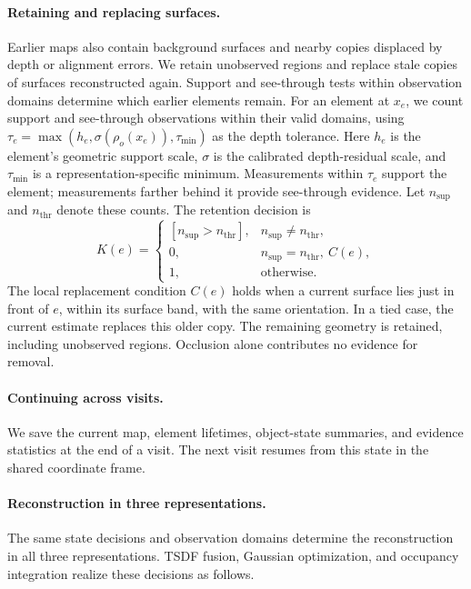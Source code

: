 \paragraph{Retaining and replacing surfaces.}
\label{sec:memory}
Earlier maps also contain background surfaces and nearby copies displaced by depth or alignment errors.
We retain unobserved regions and replace stale copies of surfaces reconstructed again.
Support and see-through tests within observation domains determine which earlier elements remain.
For an element at $x_e$, we count support and see-through observations within their valid domains, using
$\tau_e=\max(h_e,\sigma(\rho_o(x_e)),\tau_{\min})$ as the depth tolerance.
Here $h_e$ is the element's geometric support scale, $\sigma$ is the calibrated depth-residual scale, and
$\tau_{\min}$ is a representation-specific minimum.
Measurements within $\tau_e$ support the element; measurements farther behind it provide see-through evidence.
Let $n_{\mathrm{sup}}$ and $n_{\mathrm{thr}}$ denote these counts. The retention decision is
\begin{equation}
K(e)=\begin{cases}
  [n_{\mathrm{sup}}>n_{\mathrm{thr}}],&n_{\mathrm{sup}}\neq n_{\mathrm{thr}},\\
  0,&n_{\mathrm{sup}}=n_{\mathrm{thr}},\ C(e),\\
  1,&\text{otherwise}.
\end{cases}
\label{eq:continue}
\end{equation}
The local replacement condition $C(e)$ holds when a current surface lies just in front of $e$, within its surface band,
with the same orientation. In a tied case, the current estimate replaces this older copy.
The remaining geometry is retained, including unobserved regions. Occlusion alone contributes no evidence for removal.

\paragraph{Continuing across visits.}
\label{sec:handoff}
We save the current map, element lifetimes, object-state summaries, and evidence statistics at the end of a visit.
The next visit resumes from this state in the shared coordinate frame.

\paragraph{Reconstruction in three representations.}
\label{sec:representations}
The same state decisions and observation domains determine the reconstruction in all three representations.
TSDF fusion, Gaussian optimization, and occupancy integration realize these decisions as follows.


